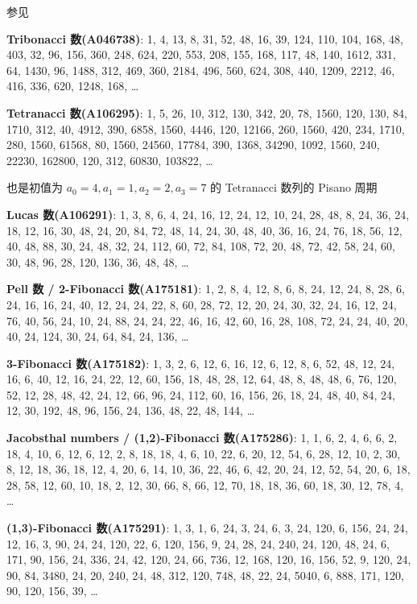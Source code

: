 \begin{enumerate}
          参见 
          
          \textbf{Tribonacci 数(A046738)}: 1, 4, 13, 8, 31, 52, 48, 16, 39, 124, 110, 104, 168, 48, 403, 32, 96, 156, 360, 248, 624, 220, 553, 208, 155, 168, 117, 48, 140, 1612, 331, 64, 1430, 96, 1488, 312, 469, 360, 2184, 496, 560, 624, 308, 440, 1209, 2212, 46, 416, 336, 620, 1248, 168, \dots
          
          \textbf{Tetranacci 数(A106295)}: 1, 5, 26, 10, 312, 130, 342, 20, 78, 1560, 120, 130, 84, 1710, 312, 40, 4912, 390, 6858, 1560, 4446, 120, 12166, 260, 1560, 420, 234, 1710, 280, 1560, 61568, 80, 1560, 24560, 17784, 390, 1368, 34290, 1092, 1560, 240, 22230, 162800, 120, 312, 60830, 103822, \dots
          
          也是初值为 \(a_0=4, a_1=1, a_2=2, a_3=7\) 的 Tetranacci 数列的 Pisano 周期
          
          \textbf{Lucas 数(A106291)}: 1, 3, 8, 6, 4, 24, 16, 12, 24, 12, 10, 24, 28, 48, 8, 24, 36, 24, 18, 12, 16, 30, 48, 24, 20, 84, 72, 48, 14, 24, 30, 48, 40, 36, 16, 24, 76, 18, 56, 12, 40, 48, 88, 30, 24, 48, 32, 24, 112, 60, 72, 84, 108, 72, 20, 48, 72, 42, 58, 24, 60, 30, 48, 96, 28, 120, 136, 36, 48, 48, \dots
          
          \textbf{Pell 数 / 2-Fibonacci 数(A175181)}: 1, 2, 8, 4, 12, 8, 6, 8, 24, 12, 24, 8, 28, 6, 24, 16, 16, 24, 40, 12, 24, 24, 22, 8, 60, 28, 72, 12, 20, 24, 30, 32, 24, 16, 12, 24, 76, 40, 56, 24, 10, 24, 88, 24, 24, 22, 46, 16, 42, 60, 16, 28, 108, 72, 24, 24, 40, 20, 40, 24, 124, 30, 24, 64, 84, 24, 136, \dots
          
          \textbf{3-Fibonacci 数(A175182)}: 1, 3, 2, 6, 12, 6, 16, 12, 6, 12, 8, 6, 52, 48, 12, 24, 16, 6, 40, 12, 16, 24, 22, 12, 60, 156, 18, 48, 28, 12, 64, 48, 8, 48, 48, 6, 76, 120, 52, 12, 28, 48, 42, 24, 12, 66, 96, 24, 112, 60, 16, 156, 26, 18, 24, 48, 40, 84, 24, 12, 30, 192, 48, 96, 156, 24, 136, 48, 22, 48, 144, \dots
          
          \textbf{Jacobsthal numbers / (1,2)-Fibonacci 数(A175286)}: 1, 1, 6, 2, 4, 6, 6, 2, 18, 4, 10, 6, 12, 6, 12, 2, 8, 18, 18, 4, 6, 10, 22, 6, 20, 12, 54, 6, 28, 12, 10, 2, 30, 8, 12, 18, 36, 18, 12, 4, 20, 6, 14, 10, 36, 22, 46, 6, 42, 20, 24, 12, 52, 54, 20, 6, 18, 28, 58, 12, 60, 10, 18, 2, 12, 30, 66, 8, 66, 12, 70, 18, 18, 36, 60, 18, 30, 12, 78, 4, \dots
          
          \textbf{(1,3)-Fibonacci 数(A175291)}: 1, 3, 1, 6, 24, 3, 24, 6, 3, 24, 120, 6, 156, 24, 24, 12, 16, 3, 90, 24, 24, 120, 22, 6, 120, 156, 9, 24, 28, 24, 240, 24, 120, 48, 24, 6, 171, 90, 156, 24, 336, 24, 42, 120, 24, 66, 736, 12, 168, 120, 16, 156, 52, 9, 120, 24, 90, 84, 3480, 24, 20, 240, 24, 48, 312, 120, 748, 48, 22, 24, 5040, 6, 888, 171, 120, 90, 120, 156, 39, \dots
\end{enumerate}

